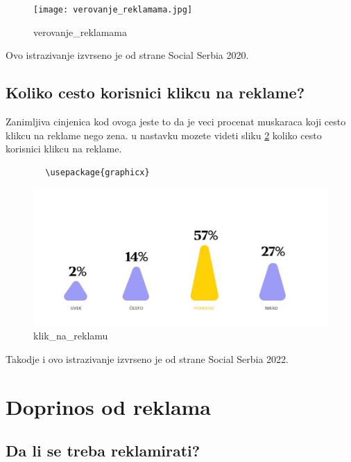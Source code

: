 \documentclass[a4paper]{article}
\begin{document}
	\begin{figure}[h!]
		\begin{center}
			\texttt{[image: verovanje\_reklamama.jpg]}
		\end{center}
		\caption{verovanje_reklamama}
		\label{fig:verovanje_reklamama}
	\end{figure}
	Ovo istrazivanje izvrseno je od strane Social Serbia 2020.
	\subsection{Koliko cesto korisnici klikcu na reklame?}
	\label{subsec:klik_na_reklamu}
	Zanimljiva cinjenica kod ovoga jeste to da je veci procenat muskaraca koji cesto klikcu na reklame nego zena. u nastavku mozete videti sliku \ref{fig:klik_na_reklamu} koliko cesto korisnici klikcu na reklame.
		\begin{verbatim}
		\usepackage{graphicx}
	\end{verbatim}
	
	\begin{figure}[h!]
		\begin{center}
			\includegraphics[scale=0.75]{klik_na_reklamu.jpg}
		\end{center}
		\caption{klik_na_reklamu}
		\label{fig:klik_na_reklamu}
	\end{figure}
	Takodje i ovo istrazivanje izvrseno je od strane Social Serbia 2022.
	\section{Doprinos od reklama}
	\label{sec:doprinos}
	\subsection{Da li se treba reklamirati?}
	\label{subsec:potrebna_reklama}
	
\end{document}
